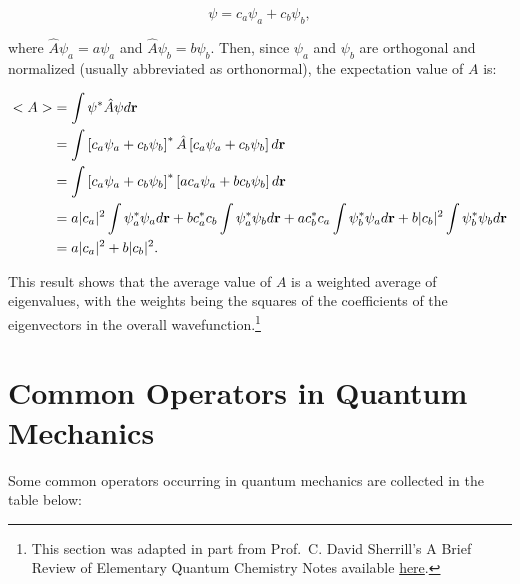 \documentclass[
  9pt,
]{extbook}
\theoremstyle{definition}
\theoremstyle{definition}
\theoremstyle{definition}
\theoremstyle{remark}
\begin{document}
\begin{equation}
\psi = c_a \psi_a + c_b \psi_b,
\label{eq:ee5}
\end{equation}

where \(\hat{A} \psi_a = a \psi_a\) and \(\hat{A} \psi_b = b \psi_b\). Then, since \(\psi_a\) and \(\psi_b\) are orthogonal and normalized (usually abbreviated as orthonormal), the expectation value of \(A\) is:

\begin{equation}
\begin{aligned}
<A> &= \int \psi^{*} \hat{A} \psi d{\bf r} \\
    &= \int \left[ c_a \psi_a + c_b \psi_b \right]^{*} \hat{A} \left[ c_a \psi_a + c_b \psi_b \right] d{\bf r}\\
    &= \int \left[ c_a \psi_a + c_b \psi_b \right]^{*}
\left[ a c_a \psi_a + b c_b \psi_b \right] d{\bf r}\\    
    &= a \vert c_a\vert^2 \int \psi_a^{*} \psi_a d{\bf r} +
b c_a^{*} c_b \int \psi_a^{*} \psi_b d{\bf r} + a c_b^{*} c_a \int \psi_b^{*} \psi_a d{\bf r} +
b \vert c_b\vert^2 \int \psi_b^{*} \psi_b d{\bf r}\\ 
    &= a \vert c_a\vert^2 + b \vert c_b\vert^2.
\end{aligned}
\label{eq:ee6}    
\end{equation}

This result shows that the average value of \(A\) is a weighted average of eigenvalues, with the weights being the squares of the coefficients of the eigenvectors in the overall wavefunction.\footnote{This section was adapted in part from Prof.~C. David Sherrill's A Brief Review of Elementary Quantum Chemistry Notes available \href{http://vergil.chemistry.gatech.edu/notes/quantrev/node1.html}{here}.}

\hypertarget{common-operators-in-quantum-mechanics}{%
\section{Common Operators in Quantum Mechanics}\label{common-operators-in-quantum-mechanics}}

Some common operators occurring in quantum mechanics are collected in the table below:

\tiny
\end{document}
